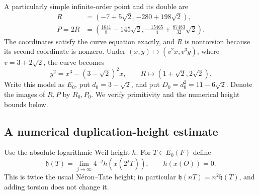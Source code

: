 \documentclass[11pt]{article}
\theoremstyle{definition}
\begin{document}
A particularly simple infinite-order point and its double are
\begin{align*}
R&=(-7+5\sqrt2,-280+198\sqrt2),\\
P=2R
 &=\left(\frac{1641}{8}-145\sqrt2,
             -\frac{15465}{4}+\frac{87483}{32}\sqrt2\right).
\end{align*}
The coordinates satisfy the curve equation exactly, and \(R\) is
nontorsion because its second coordinate is nonzero. Under
\((x,y)\mapsto(v^2x,v^3y)\), where \(v=3+2\sqrt2\), the curve
becomes
\[
 y^2=x^3-(3-\sqrt2)^2x,
 \qquad R\mapsto(1+\sqrt2,2\sqrt2).
\]
Write this model as \(E_0\), put \(d_0=3-\sqrt2\), and put
\(D_0=d_0^2=11-6\sqrt2\). Denote the images of \(R,P\) by
\(R_0,P_0\). We verify primitivity and the numerical height bounds below.

\subsection{A numerical duplication-height estimate}
\label{sec:duplication-height}

Use the absolute logarithmic Weil height \(h\). For \(T\in E_0(F)\)
define
\[
 \mathfrak h(T)=\lim_{j\to\infty}4^{-j}h(x(2^jT)),
 \qquad h(x(O))=0.
\]
This is twice the usual N\'eron--Tate height; in particular
\(\mathfrak h(nT)=n^2\mathfrak h(T)\), and adding torsion does
not change it.
\end{document}
